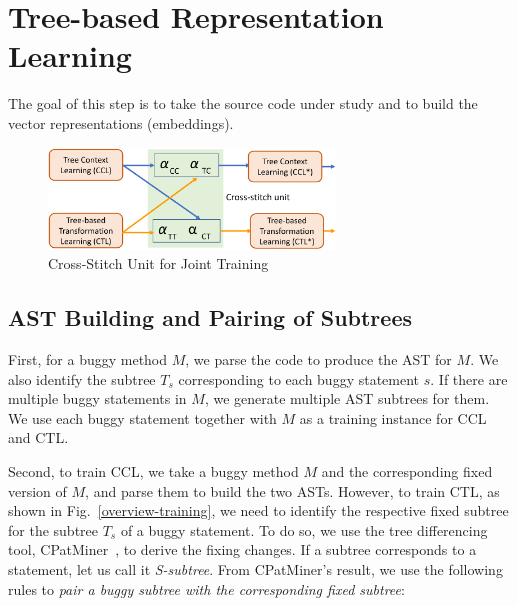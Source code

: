 \section{Tree-based Representation Learning}


The goal of this step is to take the source code under study and to
build the vector representations (embeddings).

\begin{figure}[t]
	\centering
	\includegraphics[width=3in]{graphs/cross-stitch}
        \vspace{-3pt}
	\caption{Cross-Stitch Unit for Joint Training~\cite{misra2016cross}}
	\label{fig:cross-stitch}
\end{figure}


\subsection{AST Building and Pairing of Subtrees}

First, for a buggy method $M$, we
parse the code to produce the AST for $M$. We also identify the
subtree $T_s$ corresponding to each buggy statement $s$. If there are
multiple buggy statements in $M$, we generate multiple AST subtrees
for them.  We use each buggy statement together with $M$
as a training instance for CCL and CTL.

Second, to train CCL, we take a buggy method $M$ and the corresponding
fixed version of $M$, and parse them to build the two ASTs.
%
However, to train CTL, as shown in Fig.~\ref{overview-training}, we
need to identify the respective fixed subtree for the subtree $T_s$ of
a buggy statement. To do so, we use the tree differencing tool,
CPatMiner~\cite{nguyen2019graph}, to derive the fixing changes. If a
subtree corresponds to a statement, let us call it {\em
  S-subtree}. From CPatMiner's result, we use the following rules to
{\em pair a buggy subtree with the corresponding fixed subtree}:

